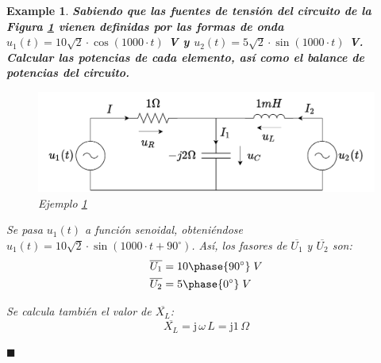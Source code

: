 \documentclass[11pt]{book} %
\numberwithin{dummy}{section}
\theoremstyle{ocrenumbox}
\theoremstyle{blacknumex}
\newtheorem{exampleT}{Example}[chapter]
\theoremstyle{blacknumbox}
\theoremstyle{ocrenum}
\newenvironment{example}{\begin{exampleT}}{\hfill{\tiny\ensuremath{\blacksquare}}\end{exampleT}}
\begin{document}
	\vspace{4mm}
	\begin{example}\label{ej.2-7}
		\textbf{Sabiendo que las fuentes de tensión del circuito de la Figura \ref{fig.problema9_garri} vienen definidas por las formas de onda $u_1(t)=10\sqrt{2}\cdot \cos(1000\cdot t)$ V y $u_2(t)=5\sqrt{2}\cdot \sin(1000\cdot t)$ V. Calcular las potencias de cada elemento, así como el balance de potencias del circuito. }
		\begin{figure}[h!]
			\centering
			\includegraphics[width=0.6\linewidth]{../figs/problema9_CA_garri.pdf}
			\caption{Ejemplo \ref{ej.2-7}}
			\label{fig.problema9_garri}
		\end{figure}
		
		Se pasa $u_1(t)$ a función senoidal, obteniéndose $u_1(t)=10\sqrt{2}\cdot \sin(1000\cdot t+90^\circ)$. Así, los fasores de $\overline{U_1}$ y $\overline{U_2}$ son:
		\begin{align*}
			\overline{U_1}&=10\phase{90^\circ}\;V\\
			\overline{U_2}&=5\phase{0^\circ}\;V
		\end{align*}
		
		Se calcula también el valor de $\overline{X_L}$:
		\begin{equation*}
			\overline{X_L}=\mathrm{j}\,\omega\, L=\mathrm{j} 1\,\Omega
		\end{equation*}
		

\end{example}
\end{document}
